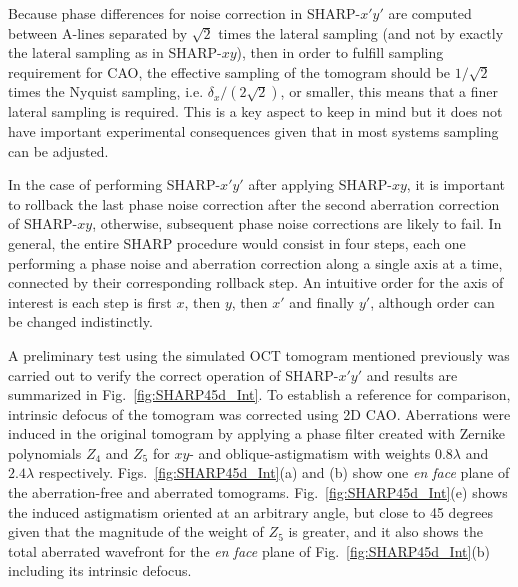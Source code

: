 Because phase differences for noise correction in SHARP-$x'y'$ are computed between A-lines separated by $\sqrt{2}$ times the lateral sampling (and not by exactly the lateral sampling as in SHARP-$xy$), then in order to fulfill sampling requirement for CAO, the effective sampling of the tomogram should be $1/\sqrt{2}$ times the Nyquist sampling, i.e. $\delta_x/(2\sqrt{2})$, or smaller, this means that a finer lateral sampling is required. This is a key aspect to keep in mind but it does not have important experimental consequences given that in most systems sampling can be adjusted.

In the case of performing SHARP-$x'y'$ after applying SHARP-$xy$, it is important to rollback the last phase noise correction after the second aberration correction of  SHARP-$xy$, otherwise, subsequent phase noise corrections are likely to fail. In general, the entire SHARP procedure would consist in four steps, each one performing a phase noise and aberration correction along a single axis at a time, connected by their corresponding rollback step. An intuitive order for the axis of interest is each step is first $x$, then $y$, then $x'$ and finally $y'$, although order can be changed indistinctly.

A preliminary test using the simulated OCT tomogram mentioned previously was carried out to verify the correct operation of SHARP-$x'y'$ and results are summarized in Fig.~\ref{fig:SHARP45d_Int}. To establish a reference for comparison, intrinsic defocus of the tomogram was corrected using 2D CAO. Aberrations were induced in the original tomogram by applying a phase filter created with Zernike polynomials $Z_4$ and $Z_5$ for $xy$- and oblique-astigmatism with weights $0.8\lambda$ and $2.4\lambda$ respectively. Figs.~\ref{fig:SHARP45d_Int}(a) and (b) show one \textit{en face} plane of the aberration-free and aberrated tomograms. Fig.~\ref{fig:SHARP45d_Int}(e) shows the induced astigmatism oriented at an arbitrary angle, but close to 45 degrees given that the magnitude of the weight of $Z_5$ is greater, and it also shows the total aberrated wavefront for the \textit{en face} plane of Fig.~\ref{fig:SHARP45d_Int}(b) including its intrinsic defocus. 

